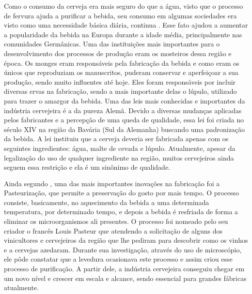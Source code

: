 Como o consumo da cerveja era mais seguro do que a água, visto que o processo de fervura ajuda a purificar a bebida, seu consumo em algumas sociedades era visto como uma necessidade básica diária, continua . Esse fato ajudou a aumentar a popularidade da bebida na Europa durante a idade média, principalmente nas comunidades Germânicas. Uma das instituições mais importantes para o desenvolvimento dos processos de produção eram os mosteiros dessa região e época. Os monges eram responsáveis pela fabricação da bebida e como eram os únicos que reproduziam os manuscritos, puderam conservar e aperfeiçoar a sua produção, sendo muito influentes até hoje. Eles foram responsáveis por incluir diversas ervas na fabricação, sendo a mais importante delas o lúpulo, utilizado para trazer o amargor da bebida. Uma das leis mais conhecidas e importantes da indústria cervejeira é a da pureza Alemã. Devido a diversas mudanças aplicadas pelos fabricantes e a percepção de uma queda de qualidade, essa lei foi criada no século XIV na região da Bavária (Sul da Alemanha) buscando uma padronização da bebida. A lei instituiu que a cerveja deveria ser fabricada apenas com os seguintes ingredientes: água, malte de cevada e lúpulo. Atualmente, apesar da legalização do uso de qualquer ingrediente na região, muitos cervejeiros ainda seguem essa restrição e ela é um sinônimo de qualidade. 


Ainda segundo , uma das mais importantes inovações na fabricação foi a Pasteurização, que permite a preservação do gosto por mais tempo. O processo consiste, basicamente, no aquecimento da bebida a uma determinada temperatura, por determinado tempo, e depois a bebida é resfriada de forma a eliminar os microorganismos ali presentes. O processo foi nomeado pelo seu criador o francês Louis Pasteur que atendendo a solicitação de alguns dos vinicultores e cervejeiros da região que lhe pediram para descobrir como os vinhos e a cervejas azedaram. Durante sua investigação, através do uso de microscópio, ele pôde constatar que a levedura ocasionava este processo e assim criou esse processo de purificação. A partir dele, a indústria cervejeira conseguiu chegar em um novo nível e crescer em escala e alcance, sendo essencial para grandes fábricas atualmente. 




